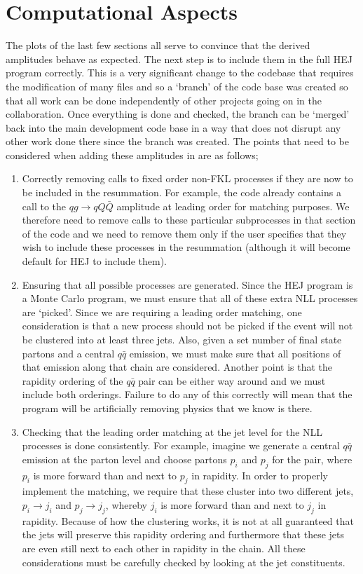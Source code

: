 \section{Computational Aspects}
The plots of the last few sections all serve to convince that the derived amplitudes behave as expected. The next step is to include them in the full HEJ program correctly. This is a very significant change to the codebase that requires the modification of many files and so a `branch' of the code base was created so that all work can be done independently of other projects going on in the collaboration. Once everything is done and checked, the branch can be `merged' back into the main development code base in a way that does not disrupt any other work done there since the branch was created. The points that need to be considered when adding these amplitudes in are as follows;
\begin{enumerate}
\item{Correctly removing calls to fixed order non-FKL processes if they are now to be included in the resummation. For example, the code already contains a call to the $qg \to qQ\bar{Q}$ amplitude at leading order for matching purposes. We therefore need to remove calls to these particular subprocesses in that section of the code and we need to remove them only if the user specifies that they wish to include these processes in the resummation (although it will become default for HEJ to include them). } 
\item{Ensuring that all possible processes are generated. Since the HEJ program is a Monte Carlo program, we must ensure that all of these extra NLL processes are `picked'. Since we are requiring a leading order matching, one consideration is that a new process should not be picked if the event will not be clustered into at least three jets. Also, given a set number of final state partons and a central $q\bar{q}$ emission, we must make sure that all positions of that emission along that chain are considered. Another point is that the rapidity ordering of the $q\bar{q}$ pair can be either way around and we must include both orderings. Failure to do any of this correctly will mean that the program will be artificially removing physics that we know is there.}
\item{Checking that the leading order matching at the jet level for the NLL processes is done consistently. For example, imagine we generate a central $q\bar{q}$ emission at the parton level and choose partons $p_i$ and $p_j$ for the pair, where $p_i$ is more forward than and next to $p_j$ in rapidity. In order to properly implement the matching, we require that these cluster into two different jets, $p_i \to j_i$ and $p_j \to j_j$, whereby $j_i$ is more forward than and next to $j_j$ in rapidity. Because of how the clustering works, it is not at all guaranteed that the jets will preserve this rapidity ordering and furthermore that these jets are even still next to each other in rapidity in the chain. All these considerations must be carefully checked by looking at the jet constituents.}
\end{enumerate} 

